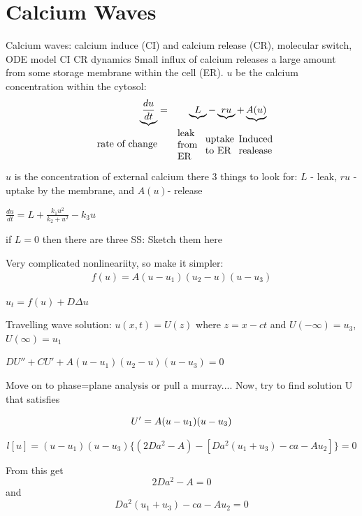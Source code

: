 \documentclass[]{article}
\numberwithin{equation}{section}		%
\def\bea{\begin{eqnarray}}
\def\ena{\end{eqnarray}}
\begin{document}
%
\section{Calcium Waves}
Calcium waves: calcium induce (CI) and calcium release (CR), molecular switch, ODE model CI CR dynamics
Small influx of calcium releases a large amount from some storage membrane within the cell (ER).
$u$ be the calcium concentration within the cytosol:
\bea
\underbrace{\frac{du}{dt}}&=& \underbrace{L}-\underbrace{ru}+\underbrace{A (u )} \\ \nonumber
\textrm{rate of change}  && \parbox{1cm}{\textrm{leak from ER}}  \parbox{1cm}{\textrm{uptake to ER}} \hspace{.2cm}   \parbox{1cm}{\textrm{Induced realease}  }
\ena

   $u$ is the concentration of external calcium there 3 things to look for: $L$ - leak, $ru$ - uptake by the membrane, and $A(u)$- release

   \begin{center}
   $\frac{du}{dt}= L + \frac{k_{1}u^{2}}{k_{2}+u^{2}}-k_{3}u$
   \end{center}
   if $L=0$ then there are three SS:
Sketch them here

Very complicated nonlineariity, so make it simpler:
\bea
 f(u)= A (u-u_{1} ) (u_{2}-u ) (u-u_{3} )
 \ena

   $u_{t}= f (u )+D\Delta u$


   Travelling wave solution: $u (x,t )= U (z )$ where $z = x-ct$ and $U(-\infty) = u_{3}$,  $ U(\infty) = u_{1}$

   \begin{center}
   $DU'' + CU'+ A (u-u_{1} ) (u_{2}-u ) (u-u_{3} )=0$
   \end{center}
Move on to phase=plane analysis or pull a murray....
   Now, try to find solution U that satisfies

   $$U' = A (u-u_{1} ) (u-u_{3} )\\$$

    $$l [u ]=(u-u_{1} ) (u-u_{3} ) \{ (2Da^{2}-A )- [Da^{2} (u_{1}+u_{3} )-ca-Au_{2} ] \}=0$$

    From this get $$2Da^{2}-A=0$$ and  $$Da^{2} (u_{1}+u_{3})-ca-Au_{2} =0$$
\end{document}
